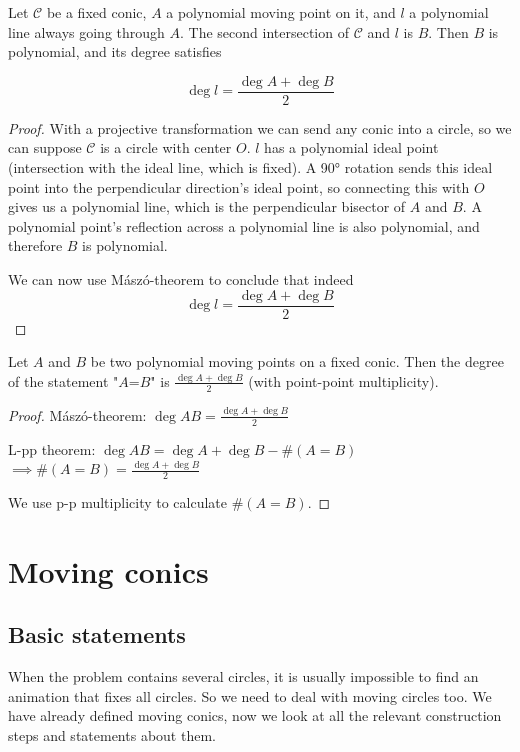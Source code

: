 \documentclass[a4paper]{article}
\begin{document}
\begin{theorem} 

    Let $\mathcal{C}$ be a fixed conic, $A$ a polynomial moving point on it, and $l$ a polynomial line always going through $A$. The second intersection of $\mathcal{C}$ and $l$ is $B$. Then $B$ is polynomial, and its degree satisfies

    $$\deg l = \frac{\deg A+\deg B}{2}$$

\end{theorem}
\begin{proof}

    With a projective transformation we can send any conic into a circle, so we can suppose $\mathcal{C}$ is a circle with center $O$. $l$ has a polynomial ideal point (intersection with the ideal line, which is fixed). A 90° rotation sends this ideal point into the perpendicular direction's ideal point, so connecting this with $O$ gives us a polynomial line, which is the perpendicular bisector of $A$ and $B$. A polynomial point's reflection across a polynomial line is also polynomial, and therefore $B$ is polynomial.

    We can now use Mászó-theorem to conclude that indeed $$\deg l = \frac{\deg A+\deg B}{2}$$
\end{proof}


\begin{theorem}
    Let $A$ and $B$ be two polynomial moving points on a fixed conic. Then the degree of the statement "$A$=$B$" is $\frac{\deg A+ \deg B}{2}$ (with point-point multiplicity).
\end{theorem}
\begin{proof}
    Mászó-theorem:
    $\deg AB=\frac{\deg A+\deg B}{2}$

    L-pp theorem:
    $\deg AB=\deg A+\deg B-\#(A=B)$ $\implies \#(A=B)=\frac{\deg A+\deg B}{2}$

    We use p-p multiplicity to calculate $\#(A=B)$.
\end{proof}

\section{Moving conics}
\subsection{Basic statements}
When the problem contains several circles, it is usually impossible to find an animation that fixes all circles. So we need to deal with moving circles too. We have already defined moving conics, now we look at all the relevant construction steps and statements about them.
\end{document}
